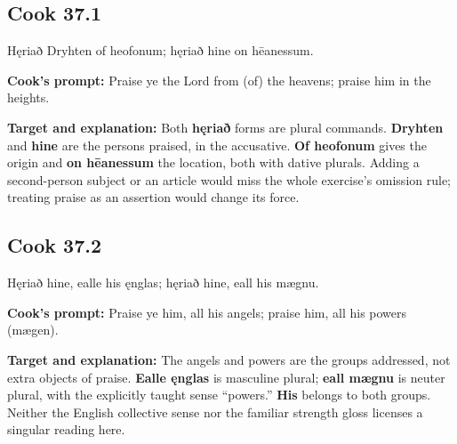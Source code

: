 \par\begin{minipage}{\linewidth}\raggedright
\subsection*{Cook 37.1}

Hęriað Dryhten of heofonum; hęriað hine on hēanessum.

\textbf{Cook's prompt:} Praise ye the Lord from (of) the heavens; praise him in the heights.

\textbf{Target and explanation:} Both \textbf{hęriað} forms are plural commands. \textbf{Dryhten} and \textbf{hine} are the persons praised, in the accusative. \textbf{Of heofonum} gives the origin and \textbf{on hēanessum} the location, both with dative plurals. Adding a second-person subject or an article would miss the whole exercise's omission rule; treating praise as an assertion would change its force.

\end{minipage}\par\addvspace{4pt}

\par\begin{minipage}{\linewidth}\raggedright
\subsection*{Cook 37.2}

Hęriað hine, ealle his ęnglas; hęriað hine, eall his mægnu.

\textbf{Cook's prompt:} Praise ye him, all his angels; praise him, all his powers (mægen).

\textbf{Target and explanation:} The angels and powers are the groups addressed, not extra objects of praise. \textbf{Ealle ęnglas} is masculine plural; \textbf{eall mægnu} is neuter plural, with the explicitly taught sense “powers.” \textbf{His} belongs to both groups. Neither the English collective sense nor the familiar strength gloss licenses a singular reading here.

\end{minipage}\par\addvspace{4pt}

